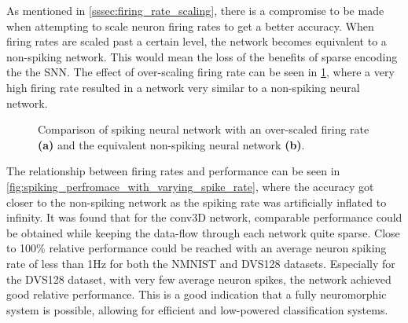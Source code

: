 As mentioned in \cref{sssec:firing_rate_scaling}, there is a compromise to be made when attempting to scale neuron firing rates to get a better accuracy. When firing rates are scaled past a certain level, the network becomes equivalent to a non-spiking network. This would mean the loss of the benefits of sparse encoding the the SNN. The effect of over-scaling firing rate can be seen in \cref{fig:over_scaling_firing_rate}, where a very high firing rate resulted in a network very similar to a non-spiking neural network.

\begin{figure}[htb]%
    \centering
    \qquad
    \caption{Comparison of spiking neural network with an over-scaled firing rate \textbf{(a)} and the equivalent non-spiking neural network \textbf{(b)}.}%
    \label{fig:over_scaling_firing_rate}%
\end{figure}

The relationship between firing rates and performance can be seen in \cref{fig:spiking_perfromace_with_varying_spike_rate}, where the accuracy got closer to the non-spiking network as the spiking rate was artificially inflated to infinity. It was found that for the conv3D network, comparable performance could be obtained while keeping the data-flow through each network quite sparse. Close to 100\% relative performance could be reached with an average neuron spiking rate of less than 1Hz for both the NMNIST and DVS128 datasets. Especially for the DVS128 dataset, with very few average neuron spikes, the network achieved good relative performance. This is a good indication that a fully neuromorphic system is possible, allowing for efficient and low-powered classification systems.

